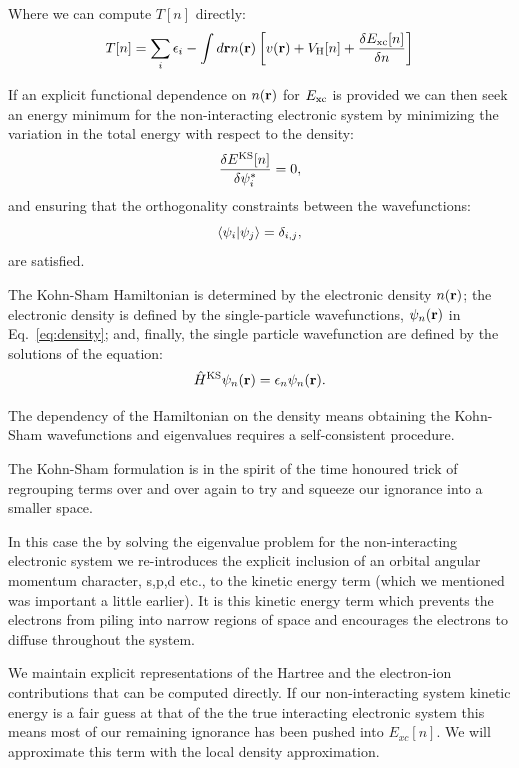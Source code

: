 Where we can compute $T[n]$ directly: 
%
\begin{equation}
T[n] = \sum_{i} \epsilon_{i} - \int d{\bf r} n({\bf r}) \left[ v({\bf r})  + V_{\rm H}[n] + \frac{\delta E_{\rm xc}[n]}{\delta n} \right]
\end{equation}

If an explicit functional dependence on $n({\bf r})$ for $E_{\rm{xc}}$ is provided 
we can then seek an energy minimum for the non-interacting electronic system 
by minimizing the variation in the total energy with respect to the density:
%
\begin{equation}
\frac{\delta E^{\rm{KS}}[n]}{\delta \psi^{*}_{i}} = 0,
\end{equation}
%
and ensuring that the orthogonality constraints between the wavefunctions:
%
\begin{equation}
\langle \psi_{i} |\psi_{j}\rangle = \delta_{i,j},
\end{equation}
%
are satisfied.
 
The Kohn-Sham Hamiltonian is determined by the electronic density $n({\bf r})$; the electronic density is 
defined by the single-particle wavefunctions, $\psi_{n}({\bf r})$ in Eq.~\ref{eq:density}; and, 
finally, the single particle wavefunction are defined by the solutions of the equation:
%
\begin{equation}
\label{eq:kseq}
\hat{H}^{\rm{KS}}\psi_{n}({\bf r}) = \epsilon_{n}\psi_{n}({\bf r}).
\end{equation}
%

The dependency of the Hamiltonian on the density means obtaining the Kohn-Sham 
wavefunctions and eigenvalues requires a self-consistent
procedure. 

The Kohn-Sham formulation is in the spirit of the time honoured 
trick of regrouping terms over and over again to try and squeeze our 
ignorance into a smaller space. 

In this case the by solving the eigenvalue problem for the non-interacting
electronic system we
re-introduces the explicit inclusion of an orbital angular momentum 
character, s,p,d etc., to the kinetic
energy term (which we mentioned was important a little earlier). 
It is this kinetic energy term which prevents the electrons from piling into 
narrow regions of space and encourages the electrons to diffuse throughout the system.

We maintain explicit representations of the Hartree and the electron-ion contributions 
that can be computed directly. If our non-interacting system kinetic energy
is a fair guess at that of the the true interacting electronic system this means most of 
our remaining ignorance has been pushed into $E_{xc}[n]$. We will
approximate this term with the local density approximation. 
 
